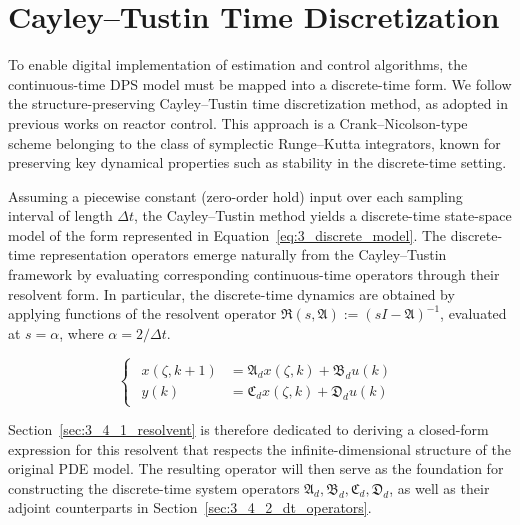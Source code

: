 \section{Cayley--Tustin Time Discretization} \label{sec:3_4_dt}

To enable digital implementation of estimation and control algorithms, the continuous-time DPS model must be mapped into a discrete-time form. We follow the structure-preserving Cayley--Tustin time discretization method, as adopted in previous works on reactor control\autocite{Khatibi2021Model, Moadeli2025Model,Moadeli2025Observer}. This approach is a Crank--Nicolson-type scheme belonging to the class of symplectic Runge--Kutta integrators, known for preserving key dynamical properties such as stability in the discrete-time setting\autocite{havu2007cayley, hairer2006geometric}.

Assuming a piecewise constant (zero-order hold) input over each sampling interval of length $\Delta t$, the Cayley--Tustin method yields a discrete-time state-space model of the form represented in Equation~\eqref{eq:3_discrete_model}. The discrete-time representation operators emerge naturally from the Cayley--Tustin framework by evaluating corresponding continuous-time operators through their resolvent form. In particular, the discrete-time dynamics are obtained by applying functions of the resolvent operator $\mathfrak{R}(s, \mathfrak{A}) := (sI - \mathfrak{A})^{-1}$, evaluated at $s = \alpha$, where $\alpha = 2 / \Delta t$.

\begin{equation} \label{eq:3_discrete_model}
    \begin{cases}
        \begin{aligned}
        x(\zeta, k{+}1) &= \mathfrak{A}_d x(\zeta, k) + \mathfrak{B}_d u(k)\\
        y(k) & = \mathfrak{C}_d x(\zeta, k) + \mathfrak{D}_d u(k)
        \end{aligned}
    \end{cases}
\end{equation}

Section~\ref{sec:3_4_1_resolvent} is therefore dedicated to deriving a closed-form expression for this resolvent that respects the infinite-dimensional structure of the original PDE model. The resulting operator will then serve as the foundation for constructing the discrete-time system operators $\mathfrak{A}_d, \mathfrak{B}_d, \mathfrak{C}_d, \mathfrak{D}_d$, as well as their adjoint counterparts in Section~\ref{sec:3_4_2_dt_operators}.


